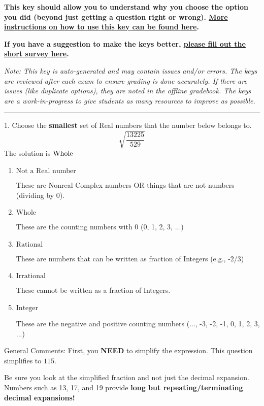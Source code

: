 \documentclass{extbook}[14pt]
\begin{document}
\textbf{This key should allow you to understand why you choose the option you did (beyond just getting a question right or wrong). \href{https://xronos.clas.ufl.edu/mac1105spring2020/courseDescriptionAndMisc/Exams/LearningFromResults}{More instructions on how to use this key can be found here}.}

\textbf{If you have a suggestion to make the keys better, \href{https://forms.gle/CZkbZmPbC9XALEE88}{please fill out the short survey here}.}

\textit{Note: This key is auto-generated and may contain issues and/or errors. The keys are reviewed after each exam to ensure grading is done accurately. If there are issues (like duplicate options), they are noted in the offline gradebook. The keys are a work-in-progress to give students as many resources to improve as possible.}

\rule{\textwidth}{0.4pt}

1. Choose the \textbf{smallest} set of Real numbers that the number below belongs to.
\[ \sqrt{\frac{13225}{529}} \] 
The solution is $ \text{\text{Whole}} $ 

\begin{enumerate}[label=\Alph*.] 
\item $ \text{Not a Real number} $ 

 These are Nonreal Complex numbers OR things that are not numbers (dividing by 0). 
\item $ \text{Whole} $ 

 These are the counting numbers with 0 (0, 1, 2, 3, ...) 
\item $ \text{Rational} $ 

 These are numbers that can be written as fraction of Integers (e.g., -2/3) 
\item $ \text{Irrational} $ 

 These cannot be written as a fraction of Integers. 
\item $ \text{Integer} $ 

 These are the negative and positive counting numbers (..., -3, -2, -1, 0, 1, 2, 3, ...) 
\end{enumerate} 
 
General Comments: First, you \textbf{NEED} to simplify the expression. This question simplifies to $115$. 
 
 Be sure you look at the simplified fraction and not just the decimal expansion. Numbers such as 13, 17, and 19 provide \textbf{long but repeating/terminating decimal expansions!} 
 
\end{document}
